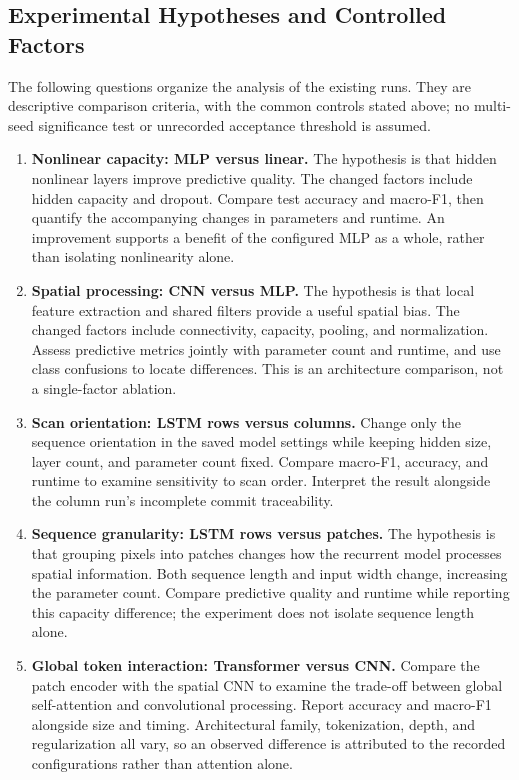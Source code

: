 \subsection{Experimental Hypotheses and Controlled Factors}

The following questions organize the analysis of the existing runs. They are descriptive comparison criteria, with the common controls stated above; no multi-seed significance test or unrecorded acceptance threshold is assumed.

\begin{enumerate}
    \item \textbf{Nonlinear capacity: MLP versus linear.} The hypothesis is that hidden nonlinear layers improve predictive quality. The changed factors include hidden capacity and dropout. Compare test accuracy and macro-F1, then quantify the accompanying changes in parameters and runtime. An improvement supports a benefit of the configured MLP as a whole, rather than isolating nonlinearity alone.
    \item \textbf{Spatial processing: CNN versus MLP.} The hypothesis is that local feature extraction and shared filters provide a useful spatial bias. The changed factors include connectivity, capacity, pooling, and normalization. Assess predictive metrics jointly with parameter count and runtime, and use class confusions to locate differences. This is an architecture comparison, not a single-factor ablation.
    \item \textbf{Scan orientation: LSTM rows versus columns.} Change only the sequence orientation in the saved model settings while keeping hidden size, layer count, and parameter count fixed. Compare macro-F1, accuracy, and runtime to examine sensitivity to scan order. Interpret the result alongside the column run's incomplete commit traceability.
    \item \textbf{Sequence granularity: LSTM rows versus patches.} The hypothesis is that grouping pixels into patches changes how the recurrent model processes spatial information. Both sequence length and input width change, increasing the parameter count. Compare predictive quality and runtime while reporting this capacity difference; the experiment does not isolate sequence length alone.
    \item \textbf{Global token interaction: Transformer versus CNN.} Compare the patch encoder with the spatial CNN to examine the trade-off between global self-attention and convolutional processing. Report accuracy and macro-F1 alongside size and timing. Architectural family, tokenization, depth, and regularization all vary, so an observed difference is attributed to the recorded configurations rather than attention alone.
\end{enumerate}
